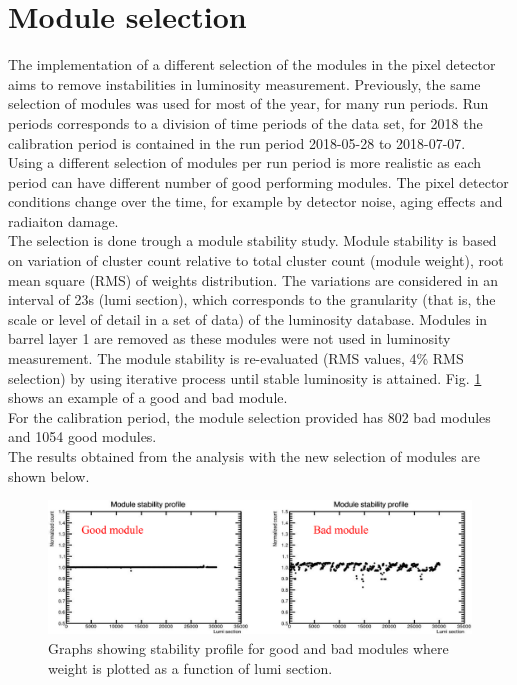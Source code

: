 \section{Module selection}
The implementation of a different selection of the modules in the pixel detector aims to remove instabilities in luminosity measurement. Previously, the same selection of modules was used for most of the year, for many run periods. Run periods corresponds to a division of time periods of the data set, for 2018 the calibration period is contained in the run period 2018-05-28 to 2018-07-07.\\
Using a different selection of modules per run period is more realistic as each period can have different number of good performing modules. The pixel detector conditions change over the time, for example by detector noise, aging effects and radiaiton damage.\\
The selection is done trough a module stability study. Module stability is based on variation of cluster count relative to total cluster count (module weight), root mean square (RMS) of weights distribution. The variations are considered in an interval of 23s (lumi section), which corresponds to the granularity (that is, the scale or level of detail in a set of data) of the luminosity database. Modules in barrel layer 1 are removed as these modules were not used in luminosity measurement. The module stability is re-evaluated (RMS values, 4\% RMS selection) by using iterative process until stable luminosity is attained. Fig. \ref{goodmodule} shows an example of a good and bad module.\\
For the calibration period, the module selection provided has 802 bad modules and 1054 good modules.\\
The results obtained from the analysis with the new selection of modules are shown below.
\begin{center}
  \begin{figure}[ht]
    \centering
    \includegraphics[scale=.23]{Chapter4/good_module.png}
    \caption[Good-bad module stability profile example]{ Graphs showing stability profile for good and bad modules where weight is plotted as a function of lumi section.} %
    \label{goodmodule}
  \end{figure}
\end{center}
